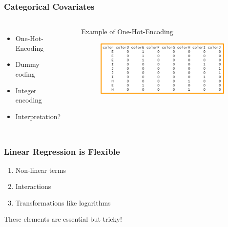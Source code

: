 \documentclass[
    utf8,
    aspectratio=169
]{beamer}  %
\begin{document}
\begin{frame}
\frametitle{Categorical Covariates}
\begin{columns}
	\begin{itemize}
		\item One-Hot-Encoding
		\item Dummy coding
		\item Integer encoding
		\item Interpretation?
	\end{itemize}
	\vspace{1cm}
	\begin{example}
	\end{example}
	\begin{block}{Example of One-Hot-Encoding}
		\begin{figure}
			\includegraphics[width=0.95\textwidth]{pics/dummy.png}
		\end{figure}
	\end{block}
	\end{columns}
\end{frame}

\begin{frame}
\frametitle{Linear Regression is Flexible}
\begin{enumerate}
	\item Non-linear terms
	\item Interactions
	\item Transformations like logarithms
\end{enumerate}

\vfill

\begin{block}{These elements are essential but tricky!}
\end{block}
\end{frame}
\end{document}
